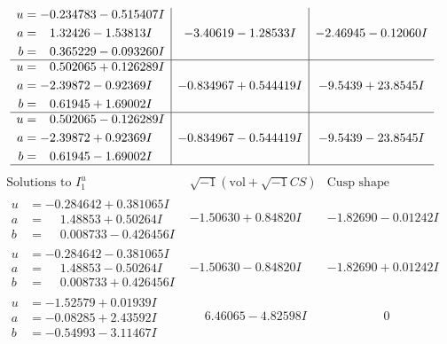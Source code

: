\documentclass[1p]{elsarticle_modified}
\theoremstyle{definition}
\newcommand{\I}{\sqrt{-1}}
\begin{document}
$$\begin{array}{c|c|c}
\begin{aligned}
u &= -0.234783 - 0.515407 I \\
a &= \phantom{-}1.32426 - 1.53813 I \\
b &= \phantom{-}0.365229 - 0.093260 I\end{aligned}
 & -3.40619 - 1.28533 I & -2.46945 - 0.12060 I \\ \hline\begin{aligned}
u &= \phantom{-}0.502065 + 0.126289 I \\
a &= -2.39872 - 0.92369 I \\
b &= \phantom{-}0.61945 + 1.69002 I\end{aligned}
 & -0.834967 + 0.544419 I & -9.5439 + 23.8545 I \\ \hline\begin{aligned}
u &= \phantom{-}0.502065 - 0.126289 I \\
a &= -2.39872 + 0.92369 I \\
b &= \phantom{-}0.61945 - 1.69002 I\end{aligned}
 & -0.834967 - 0.544419 I & -9.5439 - 23.8545 I\\
 \hline 
 \end{array}$$\newpage$$\begin{array}{c|c|c}  
\text{Solutions to }I^u_{1}& \I (\text{vol} + \sqrt{-1}CS) & \text{Cusp shape}\\
 \hline 
\begin{aligned}
u &= -0.284642 + 0.381065 I \\
a &= \phantom{-}1.48853 + 0.50264 I \\
b &= \phantom{-}0.008733 - 0.426456 I\end{aligned}
 & -1.50630 + 0.84820 I & -1.82690 - 0.01242 I \\ \hline\begin{aligned}
u &= -0.284642 - 0.381065 I \\
a &= \phantom{-}1.48853 - 0.50264 I \\
b &= \phantom{-}0.008733 + 0.426456 I\end{aligned}
 & -1.50630 - 0.84820 I & -1.82690 + 0.01242 I \\ \hline\begin{aligned}
u &= -1.52579 + 0.01939 I \\
a &= -0.08285 + 2.43592 I \\
b &= -0.54993 - 3.11467 I\end{aligned}
 & \phantom{-}6.46065 - 4.82598 I & \phantom{-0.000000 } 0 \\ \hline\begin{aligned}

\end{aligned}
\end{array}$$
\end{document}

